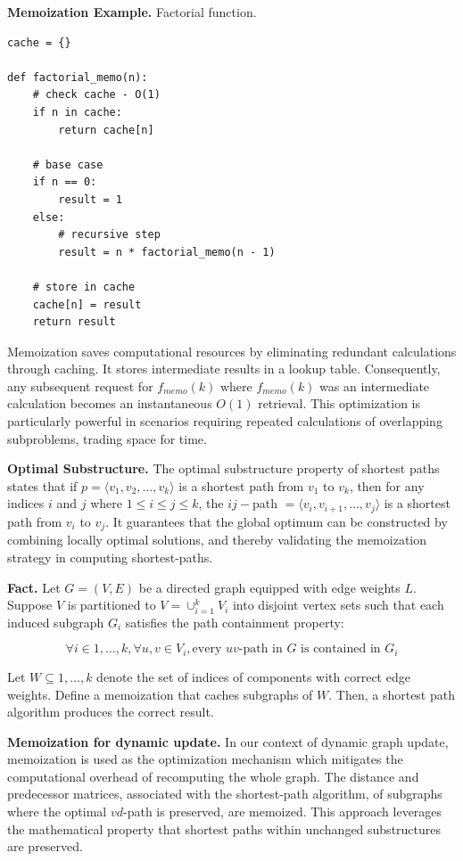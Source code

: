 \textbf{Memoization Example.} Factorial function.
\begin{verbatim}
cache = {}

def factorial_memo(n):
    # check cache - O(1)
    if n in cache:
        return cache[n]
    
    # base case
    if n == 0:
        result = 1
    else:
        # recursive step
        result = n * factorial_memo(n - 1)
    
    # store in cache
    cache[n] = result
    return result
\end{verbatim}

Memoization saves computational resources by eliminating redundant calculations through caching. It stores intermediate results in a lookup table. Consequently, any subsequent request for $f_{memo}(k)$ where $f_{memo}(k)$ was an intermediate calculation becomes an instantaneous $O(1)$ retrieval. This optimization is particularly powerful in scenarios requiring repeated calculations of overlapping subproblems, trading space for time.

\textbf{Optimal Substructure.} The optimal substructure property of shortest paths states that if $p = \langle v_1, v_2, \dots, v_k \rangle$ is a shortest path from $v_1$ to $v_k$, then for any indices $i$ and $j$ where $1 \le i \le j \le k$, the $ij-$path $= \langle v_i, v_{i+1}, \dots, v_j \rangle$ is a shortest path from $v_i$ to $v_j$. It guarantees that the global optimum can be constructed by combining locally optimal solutions, and thereby validating the memoization strategy in computing shortest-paths.

\textbf{Fact.} Let $G = (V,E)$ be a directed graph equipped with edge weights $L$. Suppose $V$ is partitioned to $V = \cup_{i=1}^k V_i$ into disjoint vertex sets such that each induced subgraph $G_i$ satisfies the path containment property:

$$
\forall i \in {1,\dots,k}, \forall u,v \in V_i, \text{every $uv$-path in $G$ is contained in $G_i$}
$$

Let $W \subseteq {1, \dots, k}$ denote the set of indices of components with correct edge weights. Define a memoization that caches subgraphs of $W$. Then, a shortest path algorithm produces the correct result.

\textbf{Memoization for dynamic update.} In our context of dynamic graph update, memoization is used as the optimization mechanism which mitigates the computational overhead of recomputing the whole graph. The distance and predecessor matrices, associated with the shortest-path algorithm, of subgraphs where the optimal $vd$-path is preserved, are memoized. This approach leverages the mathematical property that shortest paths within unchanged substructures are preserved.

